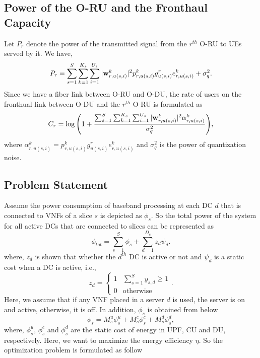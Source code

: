 \documentclass{article}
\begin{document}
\subsection{Power of the O-RU and the Fronthaul Capacity}
Let $P_r$ denote the power of the transmitted signal from the $r^{th}$ O-RU to UEs served by it. We have,
\begin{equation}\label{pr}
P_r = \sum_{s=1}^{S}\sum_{k=1}^{K_s}\sum_{i=1}^{U_s}|\bold{w}_{r,u(s,i)}^{k}|^2 p_{r,u(s,i)}^{k} g_{u(s,i)}^r e^k_{r,u(s,i)}+ \sigma_{q}^2.
\end{equation}
Since we have a fiber link between O-RU and O-DU, the rate of users on the fronthual link between O-DU and the $r^{th}$ O-RU  is formulated as
\begin{equation}\label{cr}
C_{r} = \log{\left(1+ \frac{\sum_{s=1}^{S}\sum_{k=1}^{K_s}\sum_{i=1}^{U_s}|\bold{w}_{r,u(s,i)}^{k}|^2 \mathcal{\alpha}^k_{r,u(s,i)} }{ \sigma_{q}^2}\right)},
\end{equation}
where $\mathcal{\alpha}^k_{r,u(s,i)}= p_{r,u(s,i)}^{k} g_{u(s,i)}^r e^k_{r,u(s,i)}$ and $\sigma_{q}^2$ is the power of quantization noise.
\subsection{Problem Statement}
Assume the power consumption of baseband processing at each DC $d$ that is connected to VNFs of a slice $s$ is depicted as
$\phi_{s}$. So the total power of the system for all active DCs that are connected to slices can be represented as
\begin{equation*}
\textstyle \phi_{tot} = \sum_{s=1}^{S}\phi_{s} + \sum_{d=1}^{D_c}z_d \psi_d .
\end{equation*}
where, $z_d$ is shown that whether the $d^{th}$ DC is active or not and $\psi_d$ is a static cost when a DC is active, i.e.,
\begin{equation}
  z_d =
    \begin{cases}
      1 & \sum_{s=1}^{S}y_{s,d} \geq 1 \\
      0 & \text{otherwise}
    \end{cases}.       
\end{equation}  
Here, we assume that if any VNF placed in a server $d$ is used, the server is on and active, otherwise, it is off.
In addition, $\phi_{s}$ is obtained from below
\begin{equation}
\phi_{s} = M_s^u \phi_s^u + M_s^c \phi_s^c+ M_s^d \phi_s^d,
\end{equation}
where, $\phi_s^u$, $\phi_s^c$ and $\phi_s^d$ are the static cost of energy in UPF, CU and DU, respectively.
Here, we want to maximize the energy efficiency $\eta$. 
So the optimization problem is formulated as follow
\end{document}

